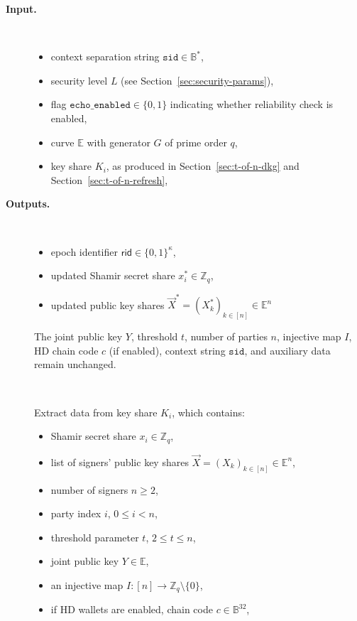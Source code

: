 \documentclass[11pt]{article}
\newcommand{\sid}{\ensuremath{\mathtt{sid}}}
\newcommand{\var}[1]{\ensuremath{\mathtt{#1}}}
\newcommand{\rid}{\textsf{rid}}
\newcommand{\E}{\mathbb{E}}
\newcommand{\Z}{\mathbb{Z}}
\newcommand{\?}[1]{\stackrel{?}{#1}}
\newcommand{\Bit}{\ensuremath{\{0{,}1\}}}
\newcommand{\Byte}{\ensuremath{\mathbb{B}}}
\begin{document}
\begin{description}
    \item[\bf Input.] \
    \begin{itemize}[noitemsep,topsep=0pt]
    \item context separation string $\sid \in \Byte^*$,
    \item security level $L$ (see Section~\ref{sec:security-params}),
    \item flag $\var{echo\_enabled} \in \Bit$ indicating whether reliability check is enabled,
    \item curve $\E$ with generator $G$ of prime order $q$,
    \item key share $K_i$, as produced in Section~\ref{sec:t-of-n-dkg} and Section~\ref{sec:t-of-n-refresh},
    \end{itemize}

    \item[\bf Outputs.] \
    \begin{itemize}[noitemsep,topsep=0pt]
    \item epoch identifier $\rid \in \Bit^\kappa$,
    \item updated Shamir secret share $x^*_i \in \Z_q$,
    \item updated public key shares $\vec X^* = (X^*_k)_{k\in[n]} \in \E^n$
    \end{itemize}
    The joint public key $Y$, threshold $t$, number of parties $n$, injective map $I$, HD chain code $c$ (if enabled), context string $\sid$, and auxiliary data remain unchanged.

    \item[] \
    \begin{algorithmic}[1]
        \State Extract data from key share $K_i$, which contains:
        \begin{itemize}[noitemsep,topsep=0pt]
        \item Shamir secret share $x_i \in \Z_q$,
        \item list of signers' public key shares $\vec X = (X_k)_{k\in[n]} \in \E^n$,
        \item number of signers $n \ge 2$,
        \item party index $i$, $0 \le i < n$,
        \item threshold parameter $t$, $2 \le t \le n$,
        \item joint public key $Y \in \E$,
        \item an injective map $I : [n] \to \Z_q \setminus \{0\}$,
        \item if HD wallets are enabled, chain code $c \in \Byte^{32}$,
        \end{itemize}
    \end{algorithmic}


\end{description}
\end{document}
